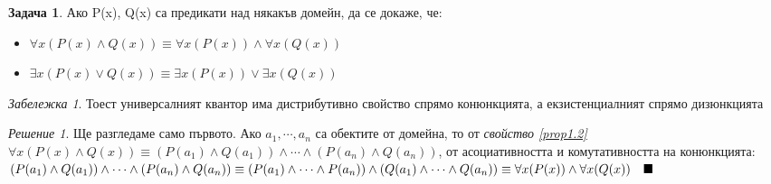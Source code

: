 \documentclass[10pt, a4paper]{article}
\theoremstyle{definition}
\newtheorem{problem}{Задача}
\theoremstyle{remark}
\newtheorem*{remark}{Забележка}
\newtheorem*{sol}{Решение}
\begin{document}
\hfill
\begin{problem}
Ако P(x), Q(x) са предикати над някакъв домейн, да се докаже, че:
    \begin{itemize}
        \item \(\forall x(P(x)\wedge Q(x)) \equiv \forall x(P(x)) \wedge \forall x(Q(x))\)
        \item \(\exists x(P(x)\vee Q(x)) \equiv \exists x(P(x)) \vee \exists x(Q(x))\)
    \end{itemize}
\end{problem}
\begin{remark}
    Тоест универсалният квантор има дистрибутивно свойство спрямо конюнкцията, а екзистенциалният спрямо дизюнкцията
\end{remark}
\begin{sol}
    Ще разгледаме само първото. Ако \(a_1, \cdots, a_n\) са обектите от домейна, то от \emph{свойство \ref{prop1.2}} \(\forall x(P(x)\wedge Q(x)) \equiv (P(a_1)\wedge Q(a_1)) \wedge \cdots \wedge (P(a_n)\wedge Q(a_n))\), от асоциативността и комутативността на конюнкцията:\\ \((P(a_1)\wedge Q(a_1)) \wedge \cdots \wedge (P(a_n)\wedge Q(a_n)) \equiv\\ (P(a_1) \wedge\cdots\wedge P(a_n)) \wedge (Q(a_1) \wedge\cdots\wedge Q(a_n)) \equiv\\ \forall x(P(x)) \wedge \forall x(Q(x)) \quad\blacksquare\) 
\end{sol}
\end{document}
